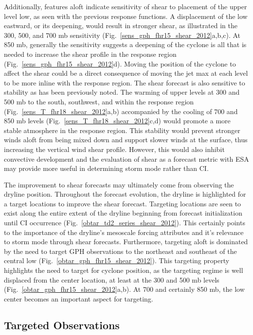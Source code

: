 \documentclass{ttuthes2007}
\newcommand{\tab}{\hspace*{2em}}  %
\begin{document}
\tab Additionally, features aloft indicate sensitivity of shear to placement of the upper level low, as seen with the previous response functions. A displacement of the low eastward, or its deepening, would result in stronger shear, as illustrated in the 300, 500, and 700 mb sensitivity (Fig.~\ref{sens_gph_fhr15_shear_2012}a,b,c). At 850 mb, generally the sensitivity suggests a deepening of the cyclone is all that is needed to increase the shear profile in the response region (Fig.~\ref{sens_gph_fhr15_shear_2012}d). Moving the position of the cyclone to affect the shear could be a direct consequence of moving the jet max at each level to be more inline with the response region. The shear forecast is also sensitive to stability as has been previously noted. The warming of upper levels at 300 and 500 mb to the south, southwest, and within the response region (Fig.~\ref{sens_T_fhr18_shear_2012}a,b) accompanied by the cooling of 700 and 850 mb levels (Fig.~\ref{sens_T_fhr18_shear_2012}c,d) would promote a more stable atmosphere in the response region. This stability would prevent stronger winds aloft from being mixed down and support slower winds at the surface, thus increasing the vertical wind shear profile. However, this would also inhibit convective development and the evaluation of shear as a forecast metric with ESA may provide more useful in determining storm mode rather than CI. 

\tab The improvement to shear forecasts may ultimately come from observing the dryline position. Throughout the forecast evolution, the dryline is highlighted for a target locations to improve the shear forecast. Targeting locations are seen to exist along the entire extent of the dryline beginning from forecast initialization until CI occurrence (Fig.~\ref{obtar_td2_series_shear_2012}). This certainly points to the importance of the dryline's mesoscale forcing attributes and it's relevance to storm mode through shear forecasts. Furthermore, targeting aloft is dominated by the need to target GPH observations to the northeast and southeast of the central low (Fig.~\ref{obtar_gph_fhr15_shear_2012}). This targeting property highlights the need to target for cyclone position, as the targeting regime is well displaced from the center location, at least at the 300 and 500 mb levels (Fig.~\ref{obtar_gph_fhr15_shear_2012}a,b). At 700 and certainly 850 mb, the low center becomes an important aspect for targeting. 

\subsection{Targeted Observations}
\end{document}
